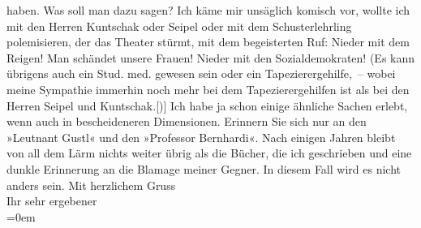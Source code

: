 \begin{ledgroupsized}[t]{13cm}
               haben. Was soll man dazu sagen? Ich käme mir unsäglich komisch vor, wollte ich mit
               den Herren Kuntschak oder Seipel oder mit dem Schusterlehrling polemisieren, der das
               Theater stürmt, mit dem begeisterten Ruf: Nieder mit dem Reigen! Man schändet unsere
               Frauen! Nieder mit den Sozialdemokraten! (Es kann übrigens auch ein Stud. med.
               gewesen sein oder ein Tapezierergehilfe, – wobei meine Sympathie immerhin noch mehr
               bei dem Tapezierergehilfen ist als bei den Herren Seipel und Kuntschak.{[}){]} Ich habe ja schon einige ähnliche Sachen
               erlebt, wenn auch in bescheideneren Dimensionen. Erinnern Sie sich nur an den »Leutnant Gustl« und den »Professor Bernhardi«. Nach einigen Jahren bleibt von all dem
               Lärm nichts weiter übrig als die Bücher, die ich geschrieben und eine dunkle
               Erinnerung an die Blamage meiner Gegner. In diesem Fall wird es nicht anders
               sein.\pend
           \pstart
           Mit herzlichem Gruss{\\[\baselineskip]}Ihr sehr ergebener{\\[\baselineskip]}\pend
           \leftskip=0em{}\endnumbering{}\end{ledgroupsized}  \newcommand{\dateiname}{L02363}\newcommand{\titel}{Arthur Schnitzler an Stefan Großmann, 17. 2. 1921}\newcommand{\editorInnen}{Martin Anton Müller und Gerd-Hermann Susen}
      